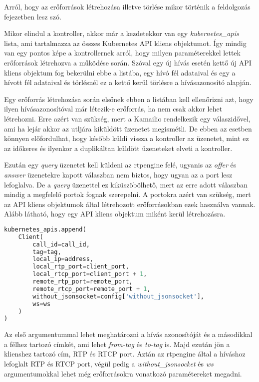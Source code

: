Arról, hogy az erőforrások létrehozása illetve törlése mikor történik a feldolgozás
fejezetben lesz szó. 

Mikor elindul a kontroller, akkor már a kezdetekkor van egy \textit{kubernetes\_apis}
lista, ami tartalmazza az összes Kubernetes API kliens objektumot. Így mindig van egy
pontos képe a kontrollernek arról, hogy milyen paraméterekkel lettek erőforrások 
létrehozva a működése során. Szóval egy új hívás esetén kettő új API kliens objektum 
fog bekerülni ebbe a listába, egy hívó fél adataival és egy a hívott fél adataival 
és törlésnél ez a kettő kerül törlésre a hívásazonosító alapján. 

Egy erőforrás létrehozása során elsőnek ebben a listában kell ellenőrizni azt, hogy
ilyen hívásazonosítóval már létezik-e erőforrás, ha nem csak akkor lehet létrehozni. 
Erre azért van szükség, mert a Kamailio rendelkezik egy válaszidővel, ami ha lejár
akkor az utljára kiküldött üzenetet megismétli. De ebben az esetben könnyen előfordulhat,
hogy később küldi vissza a kontroller az üzenetet, mint ez az időkeres és ilyenkor 
a duplikáltan küldött üzeneteket elveti a kontroller.

Ezután egy \textit{query} üzenetet kell küldeni az rtpengine felé, ugyanis az 
\textit{offer} és \textit{answer} üzenetekre kapott válaszban nem biztos, hogy ugyan
az a port lesz lefoglalva. De a \textit{query} üzenettel ez kiküszöbölhető, mert az 
erre adott válaszban mindig a megfelelő portok fognak szerepelni. A portokra azért van
szükség, mert az API kliens objektumok által létrehozott erőforrásokban ezek használva
vannak. Alább látható, hogy egy API kliens objektum miként kerül létrehozásra.

\begin{lstlisting}[language=python]
kubernetes_apis.append(
	Client(
		call_id=call_id,
		tag=tag,
		local_ip=address,
		local_rtp_port=client_port,
		local_rtcp_port=client_port + 1,
		remote_rtp_port=remote_port,
		remote_rtcp_port=remote_port + 1,
		without_jsonsocket=config['without_jsonsocket'],
		ws=ws
	)
)
\end{lstlisting}

Az első argumentummal lehet meghatározni a hívás azonosítóját és a másodikkal a félhez
tartozó címkét, ami lehet \textit{from-tag} és \textit{to-tag} is. Majd ezután jön a
klienshez tartozó cím, RTP és RTCP port. Aztán az rtpengine által a híváshoz lefoglalt
RTP és RTCP port, végül pedig a \textit{without\_jsonsocket} és \textit{ws} argumentumokkal
lehet még erőforrásokra vonatkozó paramétereket megadni.

